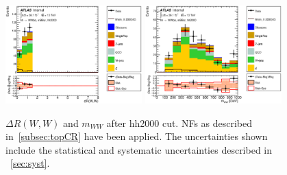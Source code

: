 \begin{figure}[!h]
\begin{center}
\includegraphics*[width=0.47\textwidth] {figures/ControlPlots/reOpt2000/C_mBBcr_reOpt2000_bbpt350_wwpt250_drww15_hh2000_drww_regionA_met25d020}
\includegraphics*[width=0.47\textwidth] {figures/ControlPlots/reOpt2000/C_mBBcr_reOpt2000_bbpt350_wwpt250_drww15_hh2000_WWMass_regionA_met25d020.eps}
\caption[$\Delta R(W,W)$and  $m_{WW}$ after hh2000 cut.]{$\Delta R(W,W)$ and  $m_{WW}$ after hh2000 cut.  \ttbar NFs as described in~\ref{subsec:topCR} have been applied. The uncertainties shown include the statistical and systematic uncertainties described in ~\ref{sec:syst}.}
\end{center}
\end{figure}


